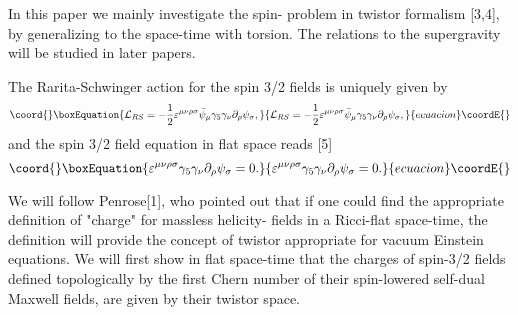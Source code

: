 \documentclass[a4paper,12pt]{article}
\begin{document}
In this paper we mainly investigate the spin-\coordHE{} problem in twistor formalism [3,4], by generalizing to the space-time with torsion. The relations to the \coordHE{} supergravity will be studied in later papers.

The Rarita-Schwinger action for the spin 3/2 fields is uniquely given by
\begin{equation}\coord{}\boxEquation{
{\cal L}_{RS}=-\frac{1}{2}\varepsilon^{\mu\nu\rho\sigma}{\bar\psi}_\mu\gamma_5\gamma_\nu\partial_\rho\psi_\sigma,
}{
{\cal L}_{RS}=-\frac{1}{2}\varepsilon^{\mu\nu\rho\sigma}{\bar\psi}_\mu\gamma_5\gamma_\nu\partial_\rho\psi_\sigma,
}{ecuacion}\coordE{}\end{equation}
and the spin 3/2 field equation in flat space reads [5]
\begin{equation}\coord{}\boxEquation{
\varepsilon^{\mu\nu\rho\sigma}\gamma_5\gamma_\nu\partial_\rho\psi_\sigma=0.
}{
\varepsilon^{\mu\nu\rho\sigma}\gamma_5\gamma_\nu\partial_\rho\psi_\sigma=0.
}{ecuacion}\coordE{}\end{equation}

We will follow Penrose[1], who pointed out that if one could find the appropriate definition of "charge" for massless helicity-\coordHE{} fields in a Ricci-flat space-time, the definition will provide the concept of twistor appropriate for vacuum Einstein equations. We will first show in flat space-time that the charges of spin-3/2 fields defined topologically by the first Chern number of their spin-lowered self-dual Maxwell fields, are given by their twistor space.
\end{document}

